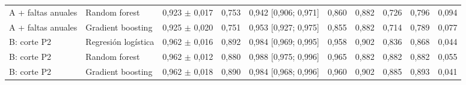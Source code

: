 \begin{tabular}{llllllllll}
A + faltas anuales & Random forest & 0,923 $\pm$ 0,017 & 0,753 & 0,942 [0,906; 0,971] & 0,860 & 0,882 & 0,726 & 0,796 & 0,094 \\
A + faltas anuales & Gradient boosting & 0,925 $\pm$ 0,020 & 0,751 & 0,953 [0,927; 0,975] & 0,855 & 0,882 & 0,714 & 0,789 & 0,077 \\
B: corte P2 & Regresión logística & 0,962 $\pm$ 0,016 & 0,892 & 0,984 [0,969; 0,995] & 0,958 & 0,902 & 0,836 & 0,868 & 0,044 \\
B: corte P2 & Random forest & 0,962 $\pm$ 0,012 & 0,880 & 0,988 [0,975; 0,996] & 0,965 & 0,882 & 0,882 & 0,882 & 0,055 \\
B: corte P2 & Gradient boosting & 0,962 $\pm$ 0,018 & 0,890 & 0,984 [0,968; 0,996] & 0,960 & 0,902 & 0,885 & 0,893 & 0,041 \\
\bottomrule
\end{tabular}
